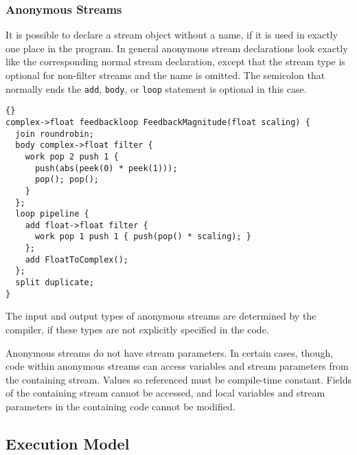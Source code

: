 \documentclass[11pt]{article}
\newcommand{\new}{\marginpar{\footnotesize \textbf{~~--~New~--}}}
\begin{document}

\subsubsection{Anonymous Streams}
\label{sec:anonymous-streams}

It is possible to declare a stream object without a name, if it is
used in exactly one place in the program.  In general anonymous stream
declarations look exactly like the corresponding normal stream
declaration, except that the stream type is optional for non-filter
streams and the name is omitted.  The semicolon that normally ends the
\lstinline|add|, \lstinline|body|, or \lstinline|loop| statement is
optional in this case.

\begin{lstlisting}{}
complex->float feedbackloop FeedbackMagnitude(float scaling) {
  join roundrobin;
  body complex->float filter {
    work pop 2 push 1 {
      push(abs(peek(0) * peek(1)));
      pop(); pop();
    }
  };
  loop pipeline {
    add float->float filter {
      work pop 1 push 1 { push(pop() * scaling); }
    };
    add FloatToComplex();
  };
  split duplicate;
}
\end{lstlisting}

The input and output types of anonymous streams are determined by the
compiler, if these types are not explicitly specified in the code.

Anonymous streams do not have stream parameters.  In certain cases,
though, code within anonymous streams can access variables and stream
parameters from the containing stream.  Values so referenced must be
compile-time constant.  Fields of the containing stream cannot be
accessed, and local variables and stream parameters in the containing
code cannot be modified.

\subsection{Execution Model}
\end{document}
